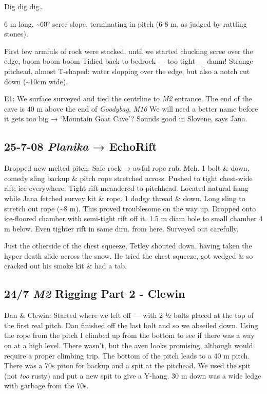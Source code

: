 Dig dig dig\ldots{}

6 m long, \textasciitilde 60° scree slope, terminating in pitch (6-8 m,
as judged by rattling stones).

First few armfuls of rock were stacked, until we started chucking scree
over the edge, boom boom boom Tidied back to bedrock --- too tight ---
damn! Strange pitchead, almost T-shaped: water slopping over the edge,
but also a notch cut down (\textasciitilde10cm wide).

E1: We surface surveyed and tied the centrline to \emph{M2} entrance.
The end of the cave is 40 m above the end of \emph{Goodybag}, \emph{M16}
We will need a better name before it gets too big → `Mountain Goat
Cave'? Sounds good in Slovene, says Jana.


\hypertarget{planika-echorift}{%
\subsection{\texorpdfstring{25-7-08 \emph{Planika} →
EchoRift}{25-7-08 Planika → EchoRift}}\label{planika-echorift}}

Dropped new melted pitch. Safe rock → awful rope rub. Meh. 1 bolt \&
down, comedy sling backup \& pitch rope stretched across. Pushed to
tight chest-wide rift; ice everywhere. Tight rift meandered to
pitchhead. Located natural hang while Jana fetched survey kit \& rope. 1
dodgy thread \& down. Long sling to stretch out rope (\textasciitilde8
m). This proved troublesome on the way up. Dropped onto ice-floored
chamber with semi-tight rift off it. 1.5 m diam hole to small chamber 4
m below. Even tighter rift in same dirn. from here. Surveyed out
carefully.

Just the otherside of the chest squeeze, Tetley shouted down, having
taken the hyper death slide across the snow. He tried the chest squeeze,
got wedged \& so cracked out his smoke kit \& had a tab.

\hypertarget{m2-rigging-part-2---clewin}{%
\subsection{\texorpdfstring{24/7 \emph{M2} Rigging Part 2 -
Clewin}{24/7 M2 Rigging Part 2 - Clewin}}\label{m2-rigging-part-2---clewin}}

Dan \& Clewin: Started where we left off --- with 2 ½ bolts placed at
the top of the first real pitch. Dan finished off the last bolt and so
we abseiled down. Using the rope from the pitch I climbed up from the
bottom to see if there was a way on at a high level. There wasn't, but
the aven looks promising, although would require a proper climbing trip.
The bottom of the pitch leads to a 40 m pitch. There was a 70s piton for
backup and a spit at the pitchead. We used the spit (not \emph{too}
rusty) and put a new spit to give a Y-hang. 30 m down was a wide ledge
with garbage from the 70s.

